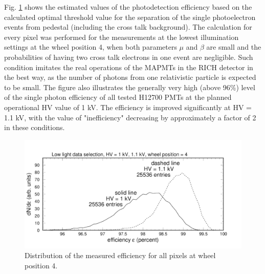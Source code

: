 Fig. \ref{fig:pglobal_eff} shows the estimated values of the photodetection efficiency based on the calculated optimal threshold value for the separation of the single photoelectron events from pedestal (including the cross talk background). The calculation for every pixel was performed for the measurements at the lowest illumination settings at the wheel position 4, when both parameters $\mu$ and $\beta$ are small and the probabilities of having two cross talk electrons in one event are negligible. Such condition imitates the real operations of the MAPMTs in the RICH detector in the best way, as the number of photons from one relativistic particle is expected to be small. The figure also illustrates the generally very high (above 96\%) level of the single photon efficiency of all tested H12700 PMTs at the planned operational HV value of 1 kV. The efficiency is improved significantly at HV = 1.1 kV, with the value of "inefficiency" decreasing by approximately a factor of 2 in these conditions.
\begin{figure}[hbt]
	\centering
	\includegraphics[width=0.98\linewidth, trim=0 15 50 35, clip]{figures/pglobal_eff.pdf}
	\caption{Distribution of the measured efficiency for all pixels at wheel position 4.}
	\label{fig:pglobal_eff}
\end{figure}

